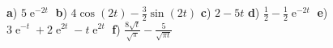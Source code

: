 {\begin{abc}
%
%
\end{abc}
}



{
{\textbf a)} $5\operatorname{e}^{-2t}                                             $
{\textbf b)} $4 \cos(2t)-\frac 32 \sin(2t)                          $
{\textbf c)} $ 2 - 5t                                               $
{\textbf d)} $\frac 12 - \frac 12 \operatorname{e}^{-2t}                          $
{\textbf e)} $3\operatorname{e}^{-t} +2\operatorname{e}^{2t} - t\operatorname{e}^{2t}                         $
{\textbf f)} $\frac{8\sqrt t }{\sqrt \pi} - \frac{5}{\sqrt{\pi t}}  $

}









